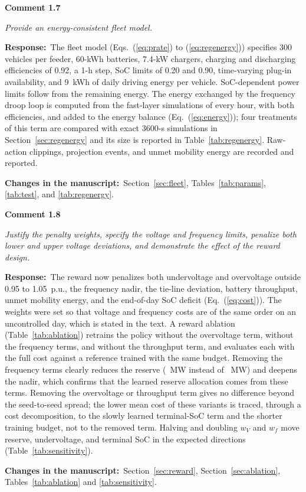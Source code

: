 \documentclass[10pt,a4paper]{article}
\newcommand{\rc}[1]{\par\noindent\textbf{Comment #1}\par}
\newcommand{\resp}{\par\noindent\textbf{Response:}\ }
\newcommand{\chg}{\par\noindent\textbf{Changes in the manuscript:}\ }
\begin{document}
\rc{1.7} \emph{Provide an energy-consistent fleet model.}
\resp The fleet model (Eqs.~(\ref{eq:prate}) to (\ref{eq:regenergy})) specifies 300 vehicles per
feeder, 60-kWh batteries, 7.4-kW chargers, charging and discharging
efficiencies of 0.92, a 1-h step, SoC limits of 0.20 and 0.90,
time-varying plug-in availability, and 9~kWh of daily driving energy
per vehicle. SoC-dependent power limits follow from the remaining
energy. The energy exchanged by the frequency droop loop is computed
from the fast-layer simulations of every hour, with both efficiencies,
and added to the energy balance (Eq.~(\ref{eq:energy})); four
treatments of this term are compared with exact 3600-s simulations in
Section~\ref{sec:regenergy} and its size is reported in
Table~\ref{tab:regenergy}. Raw-action clippings, projection events, and unmet mobility energy are recorded and
reported.
\chg Section~\ref{sec:fleet}, Tables~\ref{tab:params}, \ref{tab:test}, and \ref{tab:regenergy}.

\rc{1.8} \emph{Justify the penalty weights, specify the voltage and
frequency limits, penalize both lower and upper voltage deviations,
and demonstrate the effect of the reward design.}
\resp The reward now penalizes both undervoltage and overvoltage
outside 0.95 to 1.05~p.u., the frequency nadir, the tie-line deviation,
battery throughput, unmet mobility energy, and the end-of-day SoC
deficit (Eq.~(\ref{eq:cost})). The weights were set so that voltage and frequency
costs are of the same order on an uncontrolled day, which is stated in
the text. A reward ablation (Table~\ref{tab:ablation}) retrains the policy without the
overvoltage term, without the frequency terms, and without the
throughput term, and evaluates each with the full cost against a
reference trained with the same budget. Removing the frequency terms
clearly reduces the reserve (\AblNoFReserveMeanMw~MW instead of
\AblRefReserveMeanMw~MW) and deepens the nadir, which confirms
that the learned reserve allocation comes from these terms. Removing
the overvoltage or throughput term gives no difference beyond the
seed-to-seed spread; the lower mean cost of these variants is traced,
through a cost decomposition, to the slowly learned terminal-SoC term
and the shorter training budget, not to the removed term. Halving and
doubling $w_V$ and $w_f$ move reserve, undervoltage, and terminal SoC
in the expected directions (Table~\ref{tab:sensitivity}).
\chg Section~\ref{sec:reward}, Section~\ref{sec:ablation}, Tables~\ref{tab:ablation} and \ref{tab:sensitivity}.
\end{document}
